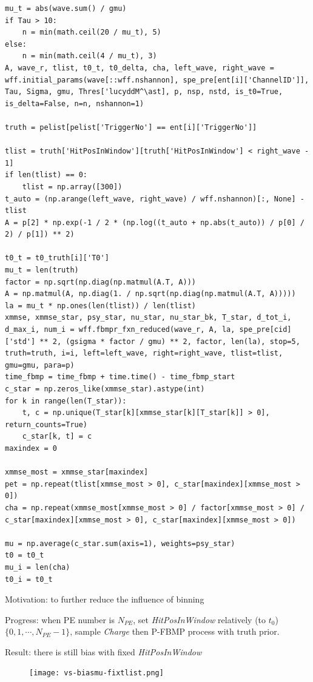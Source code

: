\documentclass[notitlepage]{article}
\begin{document}
\begin{lstlisting}
mu_t = abs(wave.sum() / gmu)
if Tau > 10:
    n = min(math.ceil(20 / mu_t), 5)
else:
    n = min(math.ceil(4 / mu_t), 3)
A, wave_r, tlist, t0_t, t0_delta, cha, left_wave, right_wave = wff.initial_params(wave[::wff.nshannon], spe_pre[ent[i]['ChannelID']], Tau, Sigma, gmu, Thres['lucyddM^\ast], p, nsp, nstd, is_t0=True, is_delta=False, n=n, nshannon=1)

truth = pelist[pelist['TriggerNo'] == ent[i]['TriggerNo']]

tlist = truth['HitPosInWindow'][truth['HitPosInWindow'] < right_wave - 1]
if len(tlist) == 0:
    tlist = np.array([300])
t_auto = (np.arange(left_wave, right_wave) / wff.nshannon)[:, None] - tlist
A = p[2] * np.exp(-1 / 2 * (np.log((t_auto + np.abs(t_auto)) / p[0] / 2) / p[1]) ** 2)

t0_t = t0_truth[i]['T0']
mu_t = len(truth)
factor = np.sqrt(np.diag(np.matmul(A.T, A)))
A = np.matmul(A, np.diag(1. / np.sqrt(np.diag(np.matmul(A.T, A)))))
la = mu_t * np.ones(len(tlist)) / len(tlist)
xmmse, xmmse_star, psy_star, nu_star, nu_star_bk, T_star, d_tot_i, d_max_i, num_i = wff.fbmpr_fxn_reduced(wave_r, A, la, spe_pre[cid]['std'] ** 2, (gsigma * factor / gmu) ** 2, factor, len(la), stop=5, truth=truth, i=i, left=left_wave, right=right_wave, tlist=tlist, gmu=gmu, para=p)
time_fbmp = time_fbmp + time.time() - time_fbmp_start
c_star = np.zeros_like(xmmse_star).astype(int)
for k in range(len(T_star)):
    t, c = np.unique(T_star[k][xmmse_star[k][T_star[k]] > 0], return_counts=True)
    c_star[k, t] = c
maxindex = 0

xmmse_most = xmmse_star[maxindex]
pet = np.repeat(tlist[xmmse_most > 0], c_star[maxindex][xmmse_most > 0])
cha = np.repeat(xmmse_most[xmmse_most > 0] / factor[xmmse_most > 0] / c_star[maxindex][xmmse_most > 0], c_star[maxindex][xmmse_most > 0])

mu = np.average(c_star.sum(axis=1), weights=psy_star)
t0 = t0_t
mu_i = len(cha)
t0_i = t0_t
\end{lstlisting}

Motivation: to further reduce the influence of binning

Progress: when PE number is $N_{PE}$, set \textit{HitPosInWindow} relatively (to $t_0$) $\{0,1,\cdots,N_{PE}-1\}$, sample \textit{Charge} then P-FBMP process with truth prior. 

Result: there is still bias with fixed \textit{HitPosInWindow}

\begin{figure}[H]
    \centering
    \texttt{[image: vs-biasmu-fixtlist.png]}
\end{figure}
\end{document}
